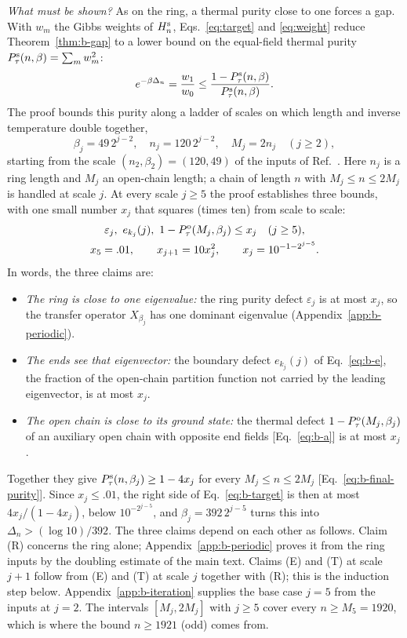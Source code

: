 \documentclass[aps,prl,reprint,amsmath,amssymb,nofootinbib,raggedbottom]{revtex4-2}
\begin{document}
\emph{What must be shown?} As on the ring, a thermal purity close to one forces
a gap. With $w_m$ the Gibbs weights of $H_n^{\mathrm{s}}$, Eqs.~\eqref{eq:target}
and \eqref{eq:weight} reduce Theorem~\ref{thm:b-gap} to a lower bound on the
equal-field thermal purity $P_{\tau}^{\mathrm{s}}(n,\beta)=\sum_mw_m^2$:
\begin{equation}
 e^{-\beta\Delta_n}=\frac{w_1}{w_0}
 \le\frac{1-P_{\tau}^{\mathrm{s}}(n,\beta)}{P_{\tau}^{\mathrm{s}}(n,\beta)}.
 \label{eq:b-target}
\end{equation}
The proof bounds this purity along a ladder of scales on which length and
inverse temperature double together,
\begin{equation}
 \beta_j=49\,2^{j-2},\quad n_j=120\,2^{j-2},\quad
 M_j=2n_j\quad(j\ge2),
 \label{eq:b-scales}
\end{equation}
starting from the scale $(n_2,\beta_2)=(120,49)$ of the inputs of
Ref.~\cite{boundary}. Here $n_j$ is a ring length and $M_j$ an open-chain
length; a chain of length $n$ with $M_j\le n\le2M_j$ is handled at scale $j$.
At every scale $j\ge5$ the proof establishes three bounds, with one
small number $x_j$ that squares (times ten) from scale to scale:
\begin{equation}
 \begin{gathered}
 \varepsilon_j,\ e_{k_j}(j),\ 1-P_{\tau}^{\mathrm{o}}(M_j,\beta_j)\le x_j\quad(j\ge5),\\
 x_5=.01,\qquad x_{j+1}=10x_j^2,\qquad
 x_j=10^{-1-2^{j-5}}.
 \end{gathered}
 \label{eq:b-x}
\end{equation}
In words, the three claims are:
\begin{itemize}
\item[(R)] \emph{The ring is close to one eigenvalue:} the ring purity defect
$\varepsilon_j$ is at most $x_j$, so the transfer operator $X_{\beta_j}$ has
one dominant eigenvalue (Appendix~\ref{app:b-periodic}).
\item[(E)] \emph{The ends see that eigenvector:} the boundary defect
$e_{k_j}(j)$ of Eq.~\eqref{eq:b-e}, the fraction of the open-chain partition
function not carried by the leading eigenvector, is at most $x_j$.
\item[(T)] \emph{The open chain is close to its ground state:} the thermal
defect $1-P_{\tau}^{\mathrm{o}}(M_j,\beta_j)$ of an auxiliary open chain with opposite end
fields [Eq.~\eqref{eq:b-a}] is at most $x_j$.
\end{itemize}
Together they give $P_{\tau}^{\mathrm{s}}(n,\beta_j)\ge1-4x_j$ for every
$M_j\le n\le2M_j$ [Eq.~\eqref{eq:b-final-purity}]. Since $x_j\le.01$, the
right side of Eq.~\eqref{eq:b-target} is then at most $4x_j/(1-4x_j)$, below
$10^{-2^{j-5}}$, and $\beta_j=392\,2^{j-5}$ turns this into
$\Delta_n>(\log10)/392$. The three claims depend on each other as follows.
Claim (R) concerns the ring alone; Appendix~\ref{app:b-periodic} proves it
from the ring inputs by the doubling estimate of the main text. Claims (E) and
(T) at scale $j+1$ follow from (E) and (T) at scale $j$ together with (R); this
is the induction step below. Appendix~\ref{app:b-iteration} supplies the base
case $j=5$ from the inputs at $j=2$. The intervals $[M_j,2M_j]$ with $j\ge5$
cover every $n\ge M_5=1920$, which is where the bound $n\ge1921$ (odd) comes
from.
\end{document}
